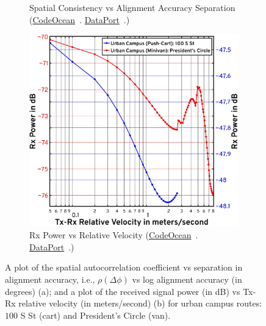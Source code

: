 \documentclass[10pt, twocolumn]{IEEEtran}
\begin{document}
{\begin{figure} [t]
\begin{subfigure}{0.4925\linewidth}
        \caption{Spatial Consistency vs Alignment Accuracy Separation (\href{https://codeocean.com/capsule/9545863/tree}{CodeOcean}~\cite{CodeOcean}. \href{http://ieee-dataport.org/12580}{DataPort}~\cite{DataPort}.)}
        \label{F8a}
    \end{subfigure}
    \begin{subfigure}{0.4975\linewidth}
        \centering
        \includegraphics[width=0.95\linewidth]{figs/rx_power_vs_velocity.pdf}
        \caption{Rx Power vs Relative Velocity (\href{https://codeocean.com/capsule/9545863/tree}{CodeOcean}~\cite{CodeOcean}. \href{http://ieee-dataport.org/12580}{DataPort}~\cite{DataPort}.)}
        \label{F8b}
    \end{subfigure}
    \vspace{-5mm}
    \caption{A plot of the spatial autocorrelation coefficient vs separation in alignment accuracy, i.e., $\rho(\Delta \phi)$ vs log alignment accuracy (in degrees) (a); and a plot of the received signal power (in dB) vs Tx-Rx relative velocity (in meters/second) (b) for urban campus routes: $100$ S St (cart) and President's Circle (van).}
    \vspace{-6mm}
    \label{F8}
\end{figure}
}
\end{document}
